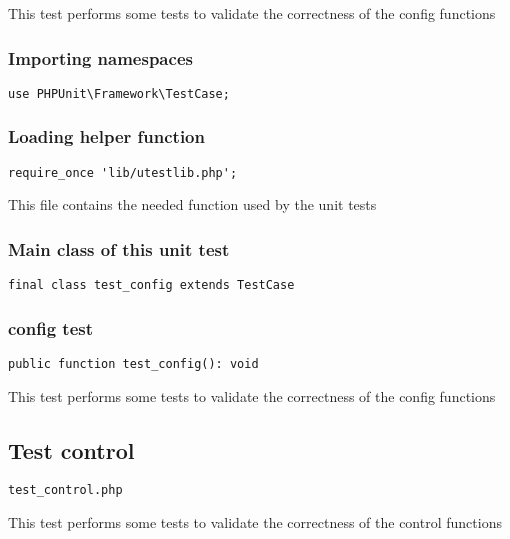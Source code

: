\documentclass[a4paper]{article}
\begin{document}
This test performs some tests to validate the correctness
of the config functions

\hypertarget{toc94}{}
\subsubsection{Importing namespaces}

\begin{lstlisting}
use PHPUnit\Framework\TestCase;
\end{lstlisting}

\hypertarget{toc95}{}
\subsubsection{Loading helper function}

\begin{lstlisting}
require_once 'lib/utestlib.php';
\end{lstlisting}

This file contains the needed function used by the unit tests

\hypertarget{toc96}{}
\subsubsection{Main class of this unit test}

\begin{lstlisting}
final class test_config extends TestCase
\end{lstlisting}

\hypertarget{toc97}{}
\subsubsection{config test}

\begin{lstlisting}
public function test_config(): void
\end{lstlisting}

This test performs some tests to validate the correctness
of the config functions

\hypertarget{toc98}{}
\subsection{Test control}

\begin{lstlisting}
test_control.php
\end{lstlisting}

This test performs some tests to validate the correctness
of the control functions
\end{document}
